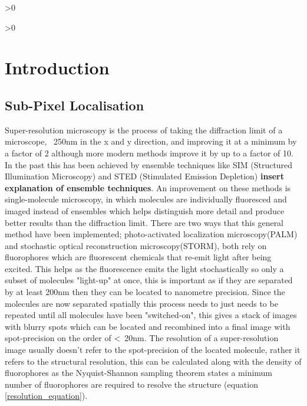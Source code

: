 \documentclass[aps,pra,a4paper,nofootinbib,onecolumn,tightenlines,longbibliography,12pt,amsfonts,amssymb,amsmath,floatfix]{revtex4-2} %
\begin{document}
\newpage
\tableofcontents %
\makeatletter
\let\toc@pre\relax
\let\toc@post\relax
\makeatother

\ifnum\totalfigures>0
\newpage
\listoffigures
{}
\fi

\ifnum\totaltables>0
\newpage
\listoftables
{}
\fi





\newpage
{}

\section{Introduction}
\label{sec:intro}
  \subsection{Sub-Pixel Localisation} %
  \label{sub:spot-finding intro}
  
  Super-resolution microscopy is the process of taking the diffraction limit 
  of a microscope, ~250nm in the x and y direction, and improving it at a minimum by a 
  factor of 2 although more modern methods improve it by up to a factor of 10. In the past this has been achieved by ensemble techniques
  like SIM (Structured Illumination Microscopy) and STED (Stimulated Emission Depletion)
  \textbf{insert explanation of ensemble techniques}. An improvement on these methods 
  is single-molecule microscopy, in which molecules are individually fluoresced and 
  imaged instead of ensembles which helps distinguish more detail and produce better
  results than the diffraction limit.
  There are two ways that this general method have been implemented; photo-activated localization
  microscopy(PALM) and stochastic optical reconstruction microscopy(STORM), both
  rely on fluorophores which are fluorescent chemicals that re-emit light after
  being excited. This helps as the fluorescence emits the light 
  stochastically so only a subset of molecules "light-up" at once, this is important 
  as if they are separated by at least 200nm then they can be located to nanometre precision. 
  Since the molecules are now separated spatially this process needs to just needs to be repeated 
  until all molecules have been "switched-on", this gives a stack of images with blurry spots
  which can be located and recombined into a final image with spot-precision on the order of <~20nm.\cite{galbraith2011super}
  The resolution of a super-resolution image usually doesn't refer to the spot-precision of the 
  located molecule, rather it refers to the structural resolution, this can be calculated along 
  with the density of fluorophores as the Nyquist-Shannon sampling theorem states a minimum number 
  of fluorophores are required to resolve the structure (equation \ref{resolution_equation}). \cite{van2011single}\cite{shannon1949communication}
\end{document}
